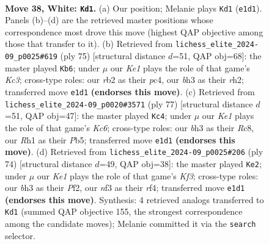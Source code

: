 \documentclass[11pt]{article}
\begin{document}
\clearpage

\begin{figure}[p]\centering
\begin{subfigure}{0.46\textwidth}\centering
\resizebox{\linewidth}{!}{%
\newchessgame
\chessboard[
  setfen={7k/R4p1p/5rp1/3P4/1p2P3/5nPb/1r5P/4K2R w - - 0 38},
  showmover=false,
  pgfstyle=straightmove, color=movearrow, markmove={e1-d1}
]}
\caption{}
\end{subfigure}\hfill
\begin{subfigure}{0.46\textwidth}\centering
\resizebox{\linewidth}{!}{%
\newchessgame
\chessboard[
  setfen={5r2/1p3r1p/p1k5/8/1NP1p2P/P7/1P1R1P1R/1K3b2 b - - 9 38},
  showmover=false,
  pgfstyle=straightmove, color=movearrow, markmove={c6-b6}
]}
\caption{}
\end{subfigure}
\\[4pt]
\begin{subfigure}{0.46\textwidth}\centering
\resizebox{\linewidth}{!}{%
\newchessgame
\chessboard[
  setfen={1rr5/8/2R3p1/1pP4p/3p3P/2k2RP1/5P2/5K2 b - - 2 39},
  showmover=false,
  pgfstyle=straightmove, color=movearrow, markmove={c3-c4}
]}
\caption{}
\end{subfigure}\hfill
\begin{subfigure}{0.46\textwidth}\centering
\resizebox{\linewidth}{!}{%
\newchessgame
\chessboard[
  setfen={8/2R5/p1p1ppk1/3p4/P2r1r2/1PR2K2/5P2/8 w - - 4 38},
  showmover=false,
  pgfstyle=straightmove, color=movearrow, markmove={f3-e2}
]}
\caption{}
\end{subfigure}
\caption{\textbf{Move 38, White: \texttt{Kd1}.} (a) Our position; Melanie plays \texttt{Kd1} (\texttt{e1d1}). Panels (b)--(d) are the retrieved master positions whose correspondence most drove this move (highest QAP objective among those that transfer to it). (b) Retrieved from \texttt{lichess\_elite\_2024-09\_p0025\#619} (ply 75) [structural distance $d$=51, QAP obj=68]: the master played \texttt{Kb6}; under $\mu$ our \emph{Ke1} plays the role of that game's \emph{Kc3}; cross-type roles: our \emph{r}b2 as their \emph{p}c4, our \emph{b}h3 as their \emph{r}h2; transferred move \texttt{e1d1} \textbf{(endorses this move)}. (c) Retrieved from \texttt{lichess\_elite\_2024-09\_p0020\#3571} (ply 77) [structural distance $d$=51, QAP obj=47]: the master played \texttt{Kc4}; under $\mu$ our \emph{Ke1} plays the role of that game's \emph{Kc6}; cross-type roles: our \emph{b}h3 as their \emph{R}c8, our \emph{R}h1 as their \emph{P}b5; transferred move \texttt{e1d1} \textbf{(endorses this move)}. (d) Retrieved from \texttt{lichess\_elite\_2024-09\_p0025\#206} (ply 74) [structural distance $d$=49, QAP obj=38]: the master played \texttt{Ke2}; under $\mu$ our \emph{Ke1} plays the role of that game's \emph{Kf3}; cross-type roles: our \emph{b}h3 as their \emph{P}f2, our \emph{n}f3 as their \emph{r}f4; transferred move \texttt{e1d1} \textbf{(endorses this move)}. Synthesis: 4 retrieved analogs transferred to \texttt{Kd1} (summed QAP objective 155, the strongest correspondence among the candidate moves); Melanie committed it via the \texttt{search} selector.}
\label{fig:thought-m74}
\end{figure}
\end{document}
